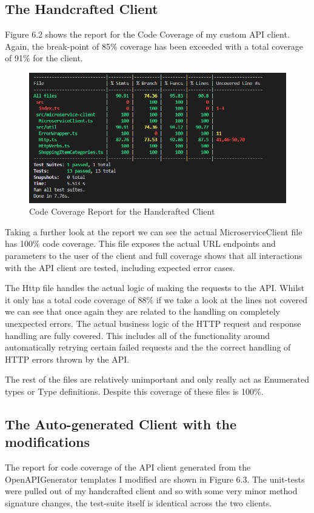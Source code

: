 \subsection{The Handcrafted Client}
Figure 6.2 shows the report for the Code Coverage of my custom API client. Again, the break-point of 85\% coverage has been exceeded with a total coverage of 91\% for the client.
\begin{figure}[!htb]
\caption{Code Coverage Report for the Handcrafted Client}
\centering
\includegraphics[scale=0.70]{FYP_Dissertation_template/Figures/handcrafted-client-code-coverage.PNG}
\end{figure}
Taking a further look at the report we can see the actual MicroserviceClient file has 100\% code coverage. This file exposes the actual URL endpoints and parameters to the user of the client and full coverage shows that all interactions with the API client are tested, including expected error cases. 

The Http file handles the actual logic of making the requests to the API. Whilst it only has a total code coverage of 88\% if we take a look at the lines not covered we can see that once again they are related to the handling on completely unexpected errors. The actual business logic of the HTTP request and response handling are fully covered. This includes all of the functionality around automatically retrying certain failed requests and the the correct handling of HTTP errors thrown by the API.

The rest of the files are relatively unimportant and only really act as Enumerated types or Type definitions. Despite this coverage of these files is 100\%.

\subsection{The Auto-generated Client with the modifications}
The report for code coverage of the API client generated from the OpenAPIGenerator templates I modified are shown in Figure 6.3. The unit-tests were pulled out of my handcrafted client and so with some very minor method signature changes, the test-suite itself is identical across the two clients.


